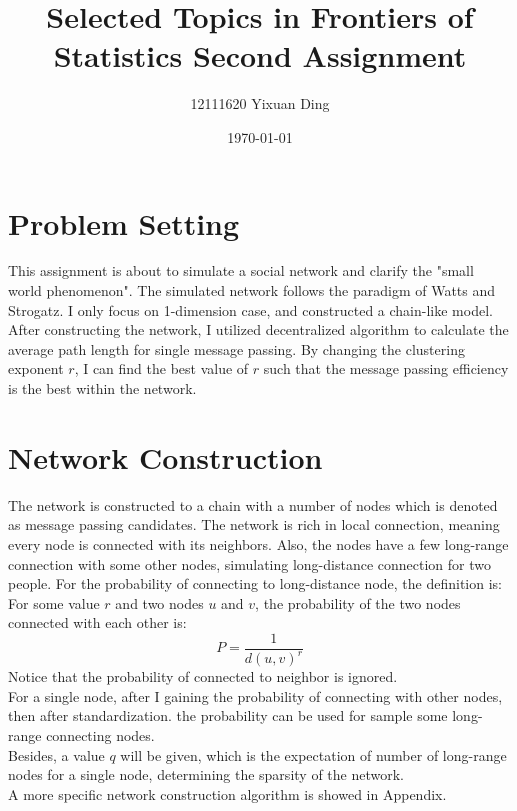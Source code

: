 \documentclass{article}
\begin{document}
	
	\title{Selected Topics in Frontiers of Statistics Second Assignment}
	\author{12111620 Yixuan Ding}
	\date{\today}
	\maketitle
	\section*{Problem Setting}
	This assignment is about to simulate a social network and clarify the "small world phenomenon". The simulated network follows the paradigm of Watts and Strogatz. I only focus on 1-dimension case, and constructed a chain-like model. After constructing the network, I utilized decentralized algorithm to calculate the average path length for single message passing. By changing the clustering exponent $r$, I can find the best value of $r$ such that the message passing efficiency is the best within the network.
	
	\section*{Network Construction}
	The network is constructed to a chain with a number of nodes which is denoted as message passing candidates. The network is rich in local connection, meaning every node is connected with its neighbors. Also, the nodes have a few long-range connection with some other nodes, simulating long-distance connection for two people. For the probability of connecting to long-distance node, the definition is:\\
	For some value $r$ and two nodes $u$ and $v$, the probability of the two nodes connected with each other is:
	$$P = \frac{1}{d(u, v)^{r}}$$
	Notice that the probability of connected to neighbor is ignored.\\
	For a single node, after I gaining the probability of connecting with other nodes, then after standardization. the probability can be used for sample some long-range connecting nodes.\\
	Besides, a value $q$ will be given, which is the expectation of number of long-range nodes for a single node, determining the sparsity of the network.\\
	A more specific network construction algorithm is showed in Appendix.
	
\end{document}
